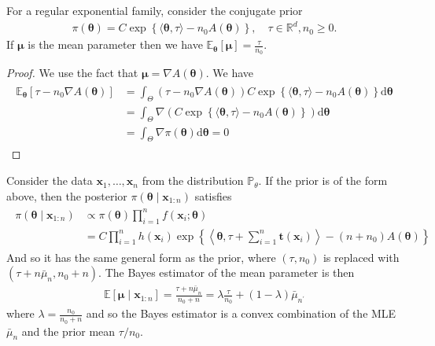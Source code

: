\begin{prop}
    For a regular exponential family, consider the conjugate prior
\begin{align*}
\pi(\boldsymbol{\theta})=C \exp \left\{\langle\boldsymbol{\theta}, \tau\rangle-n_0 A(\boldsymbol{\theta})\right\}, \quad \tau \in \mathbb{R}^d, n_0 \geq 0 .
\end{align*}
If $\boldsymbol{\mu}$ is the mean parameter then we have $\mathbb{E}_{\boldsymbol{\theta}}[\boldsymbol{\mu}]=\frac{\tau}{n_0}$.
\end{prop}
\begin{proof}
We use the fact that $\boldsymbol{\mu}=\nabla A(\boldsymbol{\theta})$. We have
\begin{align*}
\begin{aligned}
\mathbb{E}_{\boldsymbol{\theta}}\left[\tau-n_0 \nabla A(\boldsymbol{\theta})\right] & =\int_{\Theta}\left(\tau-n_0 \nabla A(\boldsymbol{\theta})\right) C \exp \left\{\langle\boldsymbol{\theta}, \tau\rangle-n_0 A(\boldsymbol{\theta})\right\} \mathrm{d} \boldsymbol{\theta} \\
& =\int_{\Theta} \nabla\left(C \exp \left\{\langle\boldsymbol{\theta}, \tau\rangle-n_0 A(\boldsymbol{\theta})\right\}\right) \mathrm{d} \boldsymbol{\theta} \\
& =\int_{\Theta} \nabla \pi(\boldsymbol{\theta}) \mathrm{d} \boldsymbol{\theta}=0
\end{aligned}
\end{align*}

\end{proof}

\begin{eg}
    Consider the data $\mathbf{x}_1, \ldots, \mathbf{x}_n$ from the distribution $\mathbb{P}_\theta$. If the prior is of the form above, then the posterior $\pi\left(\boldsymbol{\theta} \mid \mathbf{x}_{1: n}\right)$ satisfies
\begin{align*}
\begin{aligned}
\pi\left(\boldsymbol{\theta} \mid \mathbf{x}_{1: n}\right) & \propto \pi(\boldsymbol{\theta}) \prod_{i=1}^n f\left(\mathbf{x}_i ; \boldsymbol{\theta}\right) \\
& =C \prod_{i=1}^n h\left(\mathbf{x}_i\right) \exp \left\{\left\langle\boldsymbol{\theta}, \tau+\sum_{i=1}^n \mathbf{t}\left(\mathbf{x}_i\right)\right\rangle-\left(n+n_0\right) A(\boldsymbol{\theta})\right\}
\end{aligned}
\end{align*}
And so it has the same general form as the prior, where $(\tau, n_0)$ is replaced with $\left(\tau+n \bar{\mu}_n, n_0+n\right)$. The Bayes estimator of the mean parameter is then
\begin{align*}
\mathbb{E}\left[\boldsymbol{\mu} \mid \mathbf{x}_{1: n}\right]=\frac{\tau+n \bar{\mu}_n}{n_0+n}=\lambda \frac{\tau}{n_0}+(1-\lambda) \bar{\mu}_{n^{\prime}}
\end{align*}
where $\lambda=\frac{n_0}{n_0+n}$ and so the Bayes estimator is a convex combination of the MLE $\bar{\mu}_n$ and the prior mean $\tau / n_0$.
\end{eg}

